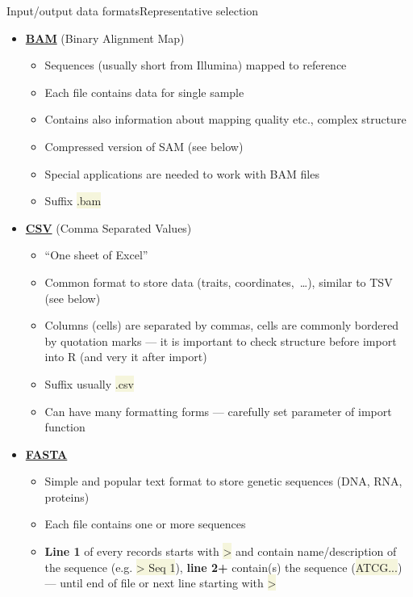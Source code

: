 \documentclass[compress, ucs, xelatex, 11pt, xcolor=svgnames, aspectratio=169,
	hyperref={
		bookmarks=true,
		unicode=true,
		colorlinks=true,
		pdftitle={Molecular data in R},
		plainpages=false,
		pdfauthor={Vojtech Zeisek},
		pdfsubject={Course about phylogeny and evolution in R},
		pdfcreator={XeLaTeX},
		pdfkeywords={R, evolution, phylogeny, molecular data},
		linkcolor=Crimson, %
		anchorcolor=Magenta, %
		citecolor=Magenta, %
		filecolor=Magenta, %
		menucolor=Magenta, %
		urlcolor=DodgerBlue, %
		pdftex},
	url={hyphens, lowtilde} %
	]{beamer}
\renewcommand{\texttt}[1]{\colorbox{Beige}{{\ttfamily #1}}}
\begin{document}
\begin{frame}[allowframebreaks]{Input/output data formats}{Representative selection}
	\begin{itemize}
		\item \href{https://en.wikipedia.org/wiki/Binary_Alignment_Map}{\textbf{BAM}} (Binary Alignment Map)
		\begin{itemize}
			\item Sequences (usually short from Illumina) mapped to reference
			\item Each file contains data for single sample
			\item Contains also information about mapping quality etc., complex structure
			\item Compressed version of SAM (see below)
			\item Special applications are needed to work with BAM files
			\item Suffix \texttt{*.bam}
		\end{itemize}
		\item \href{https://en.wikipedia.org/wiki/Comma-separated_values}{\textbf{CSV}} (Comma Separated Values)
		\begin{itemize}
			\item \enquote{One sheet of Excel}
			\item Common format to store data (traits, coordinates,~\ldots), similar to TSV (see below)
			\item Columns (cells) are separated by commas, cells are commonly bordered by quotation marks --- it is important to check structure before import into R (and very it after import)
			\item Suffix usually \texttt{*.csv}
			\item Can have many formatting forms --- carefully set parameter of import function
		\end{itemize}
		\item \href{https://en.wikipedia.org/wiki/FASTA_format}{\textbf{FASTA}}
		\begin{itemize}
			\item Simple and popular text format to store genetic sequences (DNA, RNA, proteins)
			\item Each file contains one or more sequences
			\item \textbf{Line 1} of every records starts with \texttt{>} and contain name/description of the sequence (e.g. \texttt{> Seq 1}), \textbf{line 2+} contain(s) the sequence (\texttt{ATCG...}) --- until end of file or next line starting with \texttt{>}

\end{itemize}
\end{itemize}
\end{frame}
\end{document}
